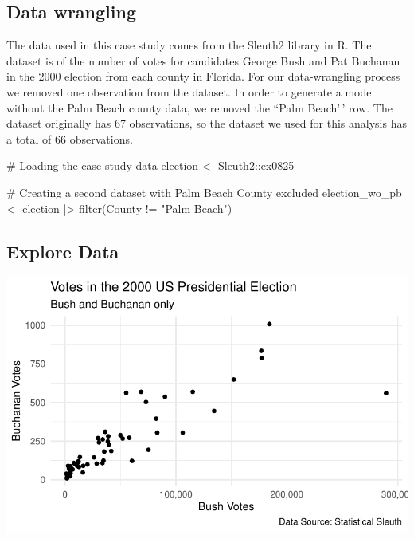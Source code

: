 \documentclass[
  letterpaper,
  DIV=11,
  numbers=noendperiod]{scrartcl}
\newenvironment{Shaded}{\begin{snugshade}}{\end{snugshade}}
\newcommand{\CommentTok}[1]{\textcolor[rgb]{0.37,0.37,0.37}{#1}}
\newcommand{\FunctionTok}[1]{\textcolor[rgb]{0.28,0.35,0.67}{#1}}
\newcommand{\NormalTok}[1]{\textcolor[rgb]{0.00,0.23,0.31}{#1}}
\newcommand{\OtherTok}[1]{\textcolor[rgb]{0.00,0.23,0.31}{#1}}
\newcommand{\SpecialCharTok}[1]{\textcolor[rgb]{0.37,0.37,0.37}{#1}}
\newcommand{\StringTok}[1]{\textcolor[rgb]{0.13,0.47,0.30}{#1}}
\begin{document}
\hypertarget{data-wrangling}{%
\subsection{Data wrangling}\label{data-wrangling}}

The data used in this case study comes from the Sleuth2 library in R.
The dataset is of the number of votes for candidates George Bush and Pat
Buchanan in the 2000 election from each county in Florida. For our
data-wrangling process we removed one observation from the dataset. In
order to generate a model without the Palm Beach county data, we removed
the ``Palm Beach'\,' row. The dataset originally has 67 observations, so
the dataset we used for this analysis has a total of 66 observations.

\begin{Shaded}
\begin{Highlighting}[]
\CommentTok{\# Loading the case study data}
\NormalTok{election }\OtherTok{\textless{}{-}}\NormalTok{ Sleuth2}\SpecialCharTok{::}\NormalTok{ex0825}

\CommentTok{\# Creating a second dataset with Palm Beach County excluded}
\NormalTok{election\_wo\_pb }\OtherTok{\textless{}{-}}\NormalTok{ election }\SpecialCharTok{|\textgreater{}} \FunctionTok{filter}\NormalTok{(County }\SpecialCharTok{!=} \StringTok{"Palm Beach"}\NormalTok{)}
\end{Highlighting}
\end{Shaded}

\hypertarget{explore-data}{%
\subsection{Explore Data}\label{explore-data}}

\includegraphics{sds-291_s-24_case-study-template_files/figure-pdf/unnamed-chunk-3-1.pdf}
\end{document}
